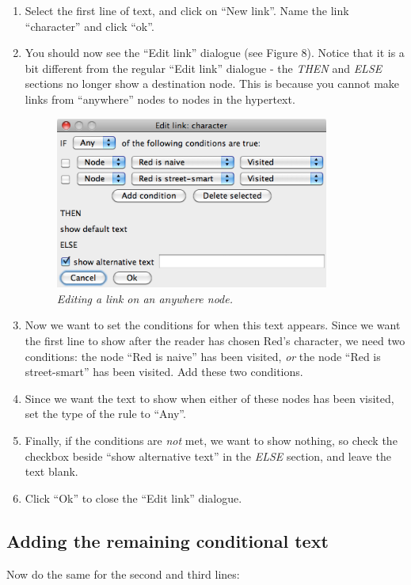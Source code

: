 \documentclass{article}
\begin{document}
\begin{enumerate}
  \item Select the first line of text, and click on ``New link''. Name the link
  ``character'' and click ``ok''.
  \item You should now see the ``Edit link'' dialogue (see Figure 8). Notice
  that it is a bit different from the regular ``Edit link'' dialogue - the \textit{THEN} and
  \textit{ELSE} sections no longer show a destination node. This is because you
  cannot make links from ``anywhere'' nodes to nodes in the hypertext.
\begin{figure}[h]
  \centering
  \includegraphics[width=9cm]{images/hypedyn-tutorial-2-figure-8}
  \caption{\textit{Editing a link on an anywhere node.}}
\end{figure} 
\item Now we want to set the conditions for when this text appears. Since we
want the first line to show after the reader has chosen Red's character, we
need two conditions: the node ``Red is naive'' has been visited, \textit{or}
the node ``Red is street-smart'' has been visited. Add these two conditions.
\item Since we want the text to show when either of these nodes has been
visited, set the type of the rule to ``Any''.
\item Finally, if the conditions are \textit{not} met, we want to show nothing,
so check the checkbox beside ``show alternative text'' in the \textit{ELSE}
section, and leave the text blank.
\item Click ``Ok'' to close the ``Edit link'' dialogue.
\end{enumerate}

\subsection{Adding the remaining conditional text}
Now do the same for the second and third lines:
\end{document}
